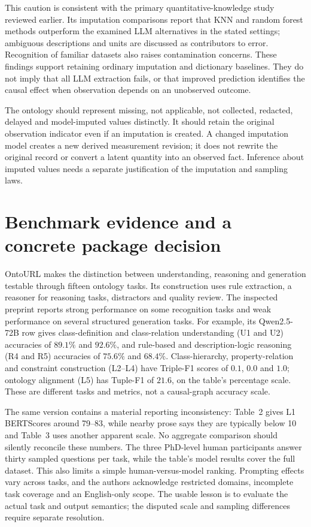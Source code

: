 This caution is consistent with the primary quantitative-knowledge study
reviewed earlier. Its imputation comparisons report that KNN and random
forest methods outperform the examined LLM alternatives in the stated
settings; ambiguous descriptions and units are discussed as contributors to
error. Recognition of familiar datasets also raises contamination concerns.
\citep{v12_la_2402_07770} These findings support retaining ordinary imputation
and dictionary baselines. They do not imply that all LLM extraction fails,
or that improved prediction identifies the causal effect when observation
depends on an unobserved outcome.

The ontology should represent missing, not applicable, not collected,
redacted, delayed and model-imputed values distinctly. It should retain the
original observation indicator even if an imputation is created. A changed
imputation model creates a new derived measurement revision; it does not
rewrite the original record or convert a latent quantity into an observed
fact. Inference about imputed values needs a separate justification of the
imputation and sampling laws.

\section{Benchmark evidence and a concrete package decision}

OntoURL makes the distinction between understanding, reasoning and generation
testable through fifteen ontology tasks. Its construction uses rule
extraction, a reasoner for reasoning tasks, distractors and quality review.
The inspected preprint reports strong performance on some recognition tasks
and weak performance on several structured generation tasks. For example,
its Qwen2.5-72B row gives class-definition and class-relation understanding
(U1 and U2) accuracies of \(89.1\%\) and \(92.6\%\), and rule-based and
description-logic reasoning (R4 and R5) accuracies of \(75.6\%\) and \(68.4\%\).
Class-hierarchy, property-relation and constraint construction (L2--L4) have
Triple-F1 scores of \(0.1\), \(0.0\) and \(1.0\); ontology alignment (L5)
has Tuple-F1 of \(21.6\), on the table's percentage scale.
These are different tasks and metrics, not a causal-graph accuracy
scale.~\citep{exec17_ontology_ontourl}

The same version contains a material reporting inconsistency: Table~2 gives
L1 BERTScores around 79--83, while nearby prose says they are typically below
10 and Table~3 uses another apparent scale. No aggregate comparison should
silently reconcile these numbers. The three PhD-level human participants
answer thirty sampled questions per task, while the table's model results
cover the full dataset. This also limits a simple human-versus-model
ranking. Prompting effects vary across tasks, and the authors acknowledge
restricted domains, incomplete task coverage and an English-only scope.
The usable lesson is to evaluate the actual task and output semantics;
the disputed scale and sampling differences require separate resolution.

